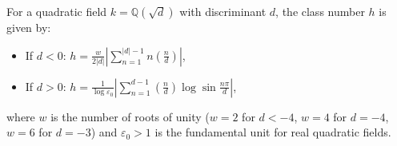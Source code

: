 For a quadratic field $k = \mathbb{Q}(\sqrt{d})$ with discriminant $d$, the class number $h$ is given by:
\begin{itemize}
\item If $d < 0$: $\displaystyle h = \frac{w}{2|d|}\left|\sum_{n=1}^{|d|-1} n\left(\frac{n}{d}\right)\right|$,
\item If $d > 0$: $\displaystyle h = \frac{1}{\log\varepsilon_0}\left|\sum_{n=1}^{d-1} \left(\frac{n}{d}\right)\log\sin\frac{n\pi}{d}\right|$,
\end{itemize}
where $w$ is the number of roots of unity ($w=2$ for $d<-4$, $w=4$ for $d=-4$, $w=6$ for $d=-3$) and $\varepsilon_0 > 1$ is the fundamental unit for real quadratic fields.
